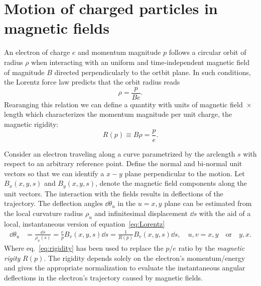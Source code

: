 \section{Motion of charged particles in magnetic fields}
An electron of charge $e$ and momentum magnitude $p$ follows a circular orbit of radius $\rho$ when interacting with an uniform and time-independent magnetic field of magnitude $B$ directed perpendicularly to the ortbit plane. In such conditions, the Lorentz force law predicts that the orbit radius reads
\begin{equation}
    \rho = \frac{p}{Be}.
    \label{eq:Lorentz}
\end{equation}
Rearanging this relation we can define a quantity with units of magnetic field~$\times$ length which characterizes the momentum magnitude per unit charge, the magnetic rigidity:
\begin{equation}
    R(p) \equiv B\rho = \frac{p}{e}.
    \label{eq:rigidity}
\end{equation}

Consider an electron traveling along a curve parametrized by the arclength $s$ with respect to an arbitrary reference point. Define the normal and bi-normal unit vectors so that we can identify a $x-y$ plane perpendicular to the motion.  Let $B_x(x,y,s)$  and $B_y(x,y,s)$, denote the magnetic field components along the unit vectors. The interaction with the fields results in deflections of the trajectory. The deflection angles $\dd\theta_u$ in the $u=x,y$ plane can be estimated from the local curvature radius $\rho_u$ and infinitesimal displacement $\dd{s}$ with the aid of a local, instantaneous version of equation~\eqref{eq:Lorentz}
    \begin{equation}
        \begin{aligned}
            \dd{\theta_u} & = \frac{\dd{s}}{\rho_u(s)} = \frac{e}{p}B_v(x,y,s)\dd s = \frac{1}{R(p)}B_v(x,y,s)\dd s, \quad u,v=x, y \quad\text{or}\quad y,x.
        \end{aligned}
        \label{eq:deflec_angles}
    \end{equation}
Where eq.~\eqref{eq:rigidity} has been used to replace the $p/e$ ratio by the \textit{magnetic rigity} $R(p)$. The rigidity depends solely on the electron's momentum/energy and gives the appropriate normalization to evaluate the instantaneous angular deflections in the electron's trajectory caused by magnetic fields.

